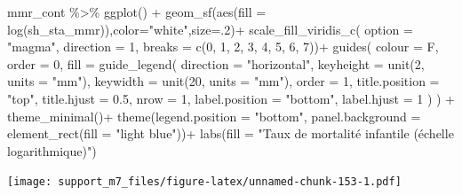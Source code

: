\documentclass[
]{book}
\newenvironment{Shaded}{\begin{snugshade}}{\end{snugshade}}
\newcommand{\AttributeTok}[1]{\textcolor[rgb]{0.77,0.63,0.00}{#1}}
\newcommand{\DecValTok}[1]{\textcolor[rgb]{0.00,0.00,0.81}{#1}}
\newcommand{\FloatTok}[1]{\textcolor[rgb]{0.00,0.00,0.81}{#1}}
\newcommand{\FunctionTok}[1]{\textcolor[rgb]{0.00,0.00,0.00}{#1}}
\newcommand{\NormalTok}[1]{#1}
\newcommand{\SpecialCharTok}[1]{\textcolor[rgb]{0.00,0.00,0.00}{#1}}
\newcommand{\StringTok}[1]{\textcolor[rgb]{0.31,0.60,0.02}{#1}}
\begin{document}
\begin{Shaded}
\begin{Highlighting}[]
\NormalTok{mmr\_cont }\SpecialCharTok{\%\textgreater{}\%} 
  \FunctionTok{ggplot}\NormalTok{() }\SpecialCharTok{+}
  \FunctionTok{geom\_sf}\NormalTok{(}\FunctionTok{aes}\NormalTok{(}\AttributeTok{fill =} \FunctionTok{log}\NormalTok{(sh\_sta\_mmr)),}\AttributeTok{color=}\StringTok{"white"}\NormalTok{,}\AttributeTok{size=}\NormalTok{.}\DecValTok{2}\NormalTok{)}\SpecialCharTok{+}
  \FunctionTok{scale\_fill\_viridis\_c}\NormalTok{(}
    \AttributeTok{option =} \StringTok{"magma"}\NormalTok{,}
    \AttributeTok{direction =} \DecValTok{1}\NormalTok{,}
    \AttributeTok{breaks =} \FunctionTok{c}\NormalTok{(}\DecValTok{0}\NormalTok{, }\DecValTok{1}\NormalTok{, }\DecValTok{2}\NormalTok{, }\DecValTok{3}\NormalTok{, }\DecValTok{4}\NormalTok{, }\DecValTok{5}\NormalTok{, }\DecValTok{6}\NormalTok{, }\DecValTok{7}\NormalTok{))}\SpecialCharTok{+}
  \FunctionTok{guides}\NormalTok{(}
    \AttributeTok{colour =}\NormalTok{ F,}
    \AttributeTok{order =} \DecValTok{0}\NormalTok{,}
    \AttributeTok{fill =} \FunctionTok{guide\_legend}\NormalTok{(}
      \AttributeTok{direction =} \StringTok{"horizontal"}\NormalTok{,}
      \AttributeTok{keyheight =} \FunctionTok{unit}\NormalTok{(}\DecValTok{2}\NormalTok{, }\AttributeTok{units =} \StringTok{"mm"}\NormalTok{),}
      \AttributeTok{keywidth =} \FunctionTok{unit}\NormalTok{(}\DecValTok{20}\NormalTok{, }\AttributeTok{units =} \StringTok{"mm"}\NormalTok{),}
      \AttributeTok{order =} \DecValTok{1}\NormalTok{,}
      \AttributeTok{title.position =} \StringTok{"top"}\NormalTok{,}
      \AttributeTok{title.hjust =} \FloatTok{0.5}\NormalTok{,}
      \AttributeTok{nrow =} \DecValTok{1}\NormalTok{,}
      \AttributeTok{label.position =} \StringTok{"bottom"}\NormalTok{,}
      \AttributeTok{label.hjust =} \DecValTok{1}
\NormalTok{    )}
\NormalTok{  ) }\SpecialCharTok{+}
  \FunctionTok{theme\_minimal}\NormalTok{()}\SpecialCharTok{+}
  \FunctionTok{theme}\NormalTok{(}\AttributeTok{legend.position =} \StringTok{"bottom"}\NormalTok{,}
        \AttributeTok{panel.background =} \FunctionTok{element\_rect}\NormalTok{(}\AttributeTok{fill =} \StringTok{"light blue"}\NormalTok{))}\SpecialCharTok{+}
  \FunctionTok{labs}\NormalTok{(}\AttributeTok{fill =} \StringTok{"Taux de mortalité infantile (échelle logarithmique)"}\NormalTok{)}
\end{Highlighting}
\end{Shaded}

\texttt{[image: support\_m7\_files/figure-latex/unnamed-chunk-153-1.pdf]}
\end{document}
